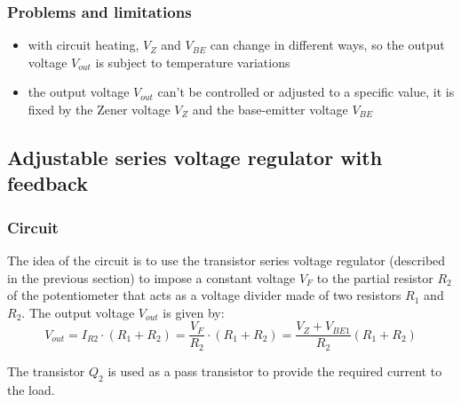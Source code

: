 \subsubsection*{Problems and limitations}
\begin{itemize}
	\item with circuit heating, \(V_Z\) and \(V_{BE}\) can change in different ways, so the output voltage \(V_{out}\) is
	subject to temperature variations
	\item the output voltage \(V_{out}\) can't be controlled or adjusted to a specific value, it is fixed by the Zener voltage
	\(V_Z\) and the base-emitter voltage \(V_{BE}\)
\end{itemize}

\newpage

\subsection{Adjustable series voltage regulator with feedback}
\subsubsection*{Circuit}
The idea of the circuit is to use the transistor series voltage regulator (described in the previous section) to impose
a constant voltage \(V_F\) to the partial resistor \(R_2\) of the potentiometer that acts as a voltage divider made of
two resistors \(R_1\) and \(R_2\). The output voltage \(V_{out}\) is given by:
\[V_{out} = I_{R2} \cdot (R_1 + R_2) = \frac{V_F}{R_2} \cdot (R_1 + R_2) = \frac{V_Z + V_{BE1}}{R_2} (R_1 + R_2)\]

\noindent
The transistor \(Q_2\) is used as a pass transistor to provide the required current to the load.

